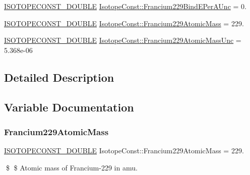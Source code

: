 \begin{DoxyCompactItemize}
\mbox{\hyperlink{group___isotope_const-_macros_ga8f45a7272ce02c0b4c65c44636ed719a}{I\+S\+O\+T\+O\+P\+E\+C\+O\+N\+S\+T\+\_\+\+D\+O\+U\+B\+LE}} \mbox{\hyperlink{group___isotope_const-_francium-_fr229_ga0c8adec2f9054430fe910e3b9d6d097e}{Isotope\+Const\+::\+Francium229\+Bind\+E\+Per\+A\+Unc}} = 0.
\item 
\mbox{\hyperlink{group___isotope_const-_macros_ga8f45a7272ce02c0b4c65c44636ed719a}{I\+S\+O\+T\+O\+P\+E\+C\+O\+N\+S\+T\+\_\+\+D\+O\+U\+B\+LE}} \mbox{\hyperlink{group___isotope_const-_francium-_fr229_ga00612a0bc8037490fdd28e8fedc2ee2c}{Isotope\+Const\+::\+Francium229\+Atomic\+Mass}} = 229.
\item 
\mbox{\hyperlink{group___isotope_const-_macros_ga8f45a7272ce02c0b4c65c44636ed719a}{I\+S\+O\+T\+O\+P\+E\+C\+O\+N\+S\+T\+\_\+\+D\+O\+U\+B\+LE}} \mbox{\hyperlink{group___isotope_const-_francium-_fr229_ga5336198f9699e106b2dccb3410590c81}{Isotope\+Const\+::\+Francium229\+Atomic\+Mass\+Unc}} = 5.\+368e-\/06
\end{DoxyCompactItemize}


\subsection{Detailed Description}


\subsection{Variable Documentation}
\mbox{\label{group___isotope_const-_francium-_fr229_ga00612a0bc8037490fdd28e8fedc2ee2c}} 
\subsubsection{\texorpdfstring{Francium229\+Atomic\+Mass}{Francium229AtomicMass}}
{\footnotesize\ttfamily \mbox{\hyperlink{group___isotope_const-_macros_ga8f45a7272ce02c0b4c65c44636ed719a}{I\+S\+O\+T\+O\+P\+E\+C\+O\+N\+S\+T\+\_\+\+D\+O\+U\+B\+LE}} Isotope\+Const\+::\+Francium229\+Atomic\+Mass = 229.}

\$ \$ Atomic mass of Francium-\/229 in amu. \mbox{\label{group___isotope_const-_francium-_fr229_ga5336198f9699e106b2dccb3410590c81}} 
